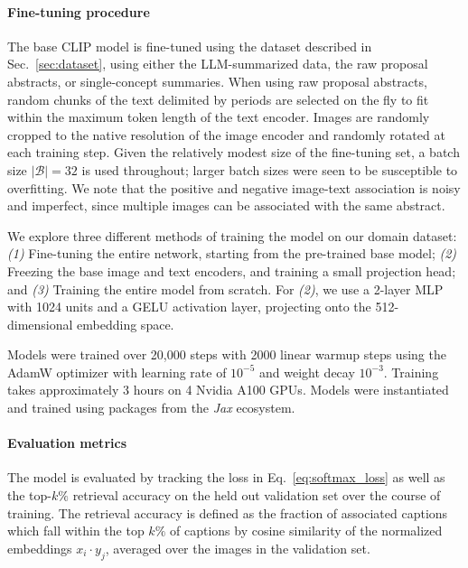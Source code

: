 \documentclass[10pt]{article} %
\newcommand{\package}[1]{\textsl{#1}\xspace}
\begin{document}
\paragraph*{Fine-tuning procedure}

The base CLIP model is fine-tuned using the dataset described in Sec.~\ref{sec:dataset}, using either the LLM-summarized data, the raw proposal abstracts, or single-concept summaries.
%
When using raw proposal abstracts, random chunks of the text delimited by periods are selected on the fly to fit within the maximum token length of the text encoder.
%
Images are randomly cropped to the native resolution of the image encoder and randomly rotated at each training step.
%
Given the relatively modest size of the fine-tuning set, a batch size $|\mathcal B| = 32$ is used throughout; larger batch sizes were seen to be susceptible to overfitting.
%
We note that the positive and negative image-text association is noisy and imperfect, since multiple images can be associated with the same abstract.

We explore three different methods of training the model on our domain dataset: \emph{(1)} Fine-tuning the entire network, starting from the pre-trained base model; \emph{(2)} Freezing the base image and text encoders, and training a small projection head; and \emph{(3)} Training the entire model from scratch.
%
For \emph{(2)}, we use a 2-layer MLP with 1024 units and a GELU activation layer, projecting onto the 512-dimensional embedding space.

Models were trained over 20,000 steps with 2000 linear warmup steps 
using the AdamW optimizer \citep{DBLP:conf/iclr/LoshchilovH19,DBLP:journals/corr/KingmaB14} with  %
learning rate of $10^{-5}$ and weight decay $10^{-3}$.
%
Training takes approximately 3 hours on 4 Nvidia A100 GPUs.
Models were instantiated and trained using packages from the \package{Jax} \citep{jax2018github} ecosystem.
%


\paragraph*{Evaluation metrics}

The model is evaluated by tracking the loss in Eq.~\ref{eq:softmax_loss} as well as the top-$k\%$ retrieval accuracy on the held out validation set over the course of training.
%
The retrieval accuracy is defined as the fraction of associated captions which fall within the top $k\%$ of captions by cosine similarity of the normalized embeddings $x_i \cdot y_j$, averaged over the images in the validation set.
\end{document}
